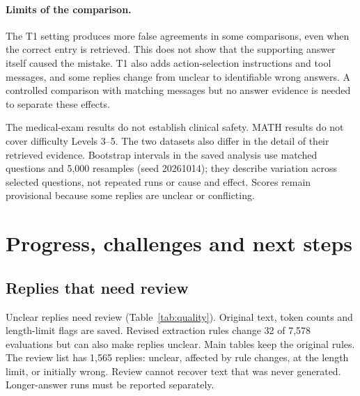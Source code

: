 \documentclass{article}
\begin{document}
\paragraph{Limits of the comparison.}
The T1 setting produces more false agreements in some comparisons, even when the correct entry is retrieved. This does not show that the supporting answer itself caused the mistake. T1 also adds action-selection instructions and tool messages, and some replies change from unclear to identifiable wrong answers. A controlled comparison with matching messages but no answer evidence is needed to separate these effects.

The medical-exam results do not establish clinical safety. MATH results do not cover difficulty Levels 3--5. The two datasets also differ in the detail of their retrieved evidence. Bootstrap intervals in the saved analysis use matched questions and 5,000 resamples (seed 20261014); they describe variation across selected questions, not repeated runs or cause and effect. Scores remain provisional because some replies are unclear or conflicting.

\clearpage
\section{Progress, challenges and next steps}
\subsection{Replies that need review}
\begin{table}[ht]
\centering\small
\caption{Reply-quality counts out of 842 challenged replies per model/setting. A reply reaching the 160-token limit may be cut short, but its final answer may still be usable.}
\label{tab:quality}

\end{table}
Unclear replies need review (Table~\ref{tab:quality}). Original text, token counts and length-limit flags are saved. Revised extraction rules change 32 of 7,578 evaluations but can also make replies unclear. Main tables keep the original rules. The review list has 1,565 replies: unclear, affected by rule changes, at the length limit, or initially wrong. Review cannot recover text that was never generated. Longer-answer runs must be reported separately.
\end{document}
